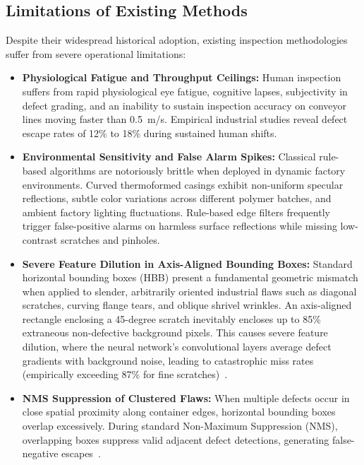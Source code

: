 \subsection{Limitations of Existing Methods}
\label{subsec:limitations}

Despite their widespread historical adoption, existing inspection methodologies suffer from severe operational limitations:

\begin{itemize}
\item \textbf{Physiological Fatigue and Throughput Ceilings:} Human inspection suffers from rapid physiological eye fatigue, cognitive lapses, subjectivity in defect grading, and an inability to sustain inspection accuracy on conveyor lines moving faster than 0.5~m/s. Empirical industrial studies reveal defect escape rates of 12\% to 18\% during sustained human shifts.
\item \textbf{Environmental Sensitivity and False Alarm Spikes:} Classical rule-based algorithms are notoriously brittle when deployed in dynamic factory environments. Curved thermoformed casings exhibit non-uniform specular reflections, subtle color variations across different polymer batches, and ambient factory lighting fluctuations. Rule-based edge filters frequently trigger false-positive alarms on harmless surface reflections while missing low-contrast scratches and pinholes.
\item \textbf{Severe Feature Dilution in Axis-Aligned Bounding Boxes:} Standard horizontal bounding boxes (HBB) present a fundamental geometric mismatch when applied to slender, arbitrarily oriented industrial flaws such as diagonal scratches, curving flange tears, and oblique shrivel wrinkles. An axis-aligned rectangle enclosing a 45-degree scratch inevitably encloses up to 85\% extraneous non-defective background pixels. This causes severe feature dilution, where the neural network's convolutional layers average defect gradients with background noise, leading to catastrophic miss rates (empirically exceeding 87\% for fine scratches)~\cite{chen2025obb,zhao2024small}.
\item \textbf{NMS Suppression of Clustered Flaws:} When multiple defects occur in close spatial proximity along container edges, horizontal bounding boxes overlap excessively. During standard Non-Maximum Suppression (NMS), overlapping boxes suppress valid adjacent defect detections, generating false-negative escapes~\cite{yang2024gradient}.
\end{itemize}

